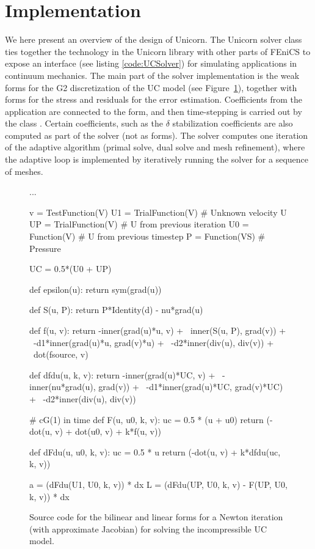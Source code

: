 \section{Implementation}

We here present an overview of the design of Unicorn. The Unicorn
solver class  ties together the technology in the
Unicorn library with other parts of FEniCS to expose an interface (see
listing \ref{code:UCSolver}) for simulating applications in continuum
mechanics. The main part of the solver implementation is the weak
forms for the G2 discretization of the UC model (see
Figure~\ref{code:FFC_UC}), together with forms for the stress and
residuals for the error estimation. Coefficients from the application
are connected to the form, and then time-stepping is carried out by
the class . Certain coefficients, such as the
$\delta$ stabilization coefficients are also computed as part of the
solver (not as forms). The solver computes one iteration of the
adaptive algorithm (primal solve, dual solve and mesh refinement),
where the adaptive loop is implemented by iteratively running the
solver for a sequence of meshes.

\begin{figure}
\bwfig
\begin{uflcode}
...

v = TestFunction(V)
U1 = TrialFunction(V) # Unknown velocity U
UP = TrialFunction(V) # U from previous iteration
U0 = Function(V)      # U from previous timestep
P = Function(VS)      # Pressure

UC = 0.5*(U0 + UP)

def epsilon(u):
    return sym(grad(u))

def S(u, P):
    return P*Identity(d) - nu*grad(u)

def f(u, v):
    return -inner(grad(u)*u, v) + \
        inner(S(u, P), grad(v)) + \
        -d1*inner(grad(u)*u, grad(v)*u) + \
        -d2*inner(div(u), div(v)) + \
        dot(fsource, v)

def dfdu(u, k, v):
    return -inner(grad(u)*UC, v) + \
        -inner(nu*grad(u), grad(v)) + \
        -d1*inner(grad(u)*UC, grad(v)*UC) + \
        -d2*inner(div(u), div(v))

# cG(1) in time
def F(u, u0, k, v):
    uc = 0.5 * (u + u0)
    return (-dot(u, v) + dot(u0, v) + k*f(u, v))

def dFdu(u, u0, k, v):
    uc = 0.5 * u
    return (-dot(u, v) + k*dfdu(uc, k, v))

a = (dFdu(U1, U0, k, v)) * dx
L = (dFdu(UP, U0, k, v) - F(UP, U0, k, v)) * dx
\end{uflcode}
\caption{Source code for the bilinear and linear forms for a Newton
  iteration (with approximate Jacobian) for solving the incompressible
  UC model.}
\label{code:FFC_UC}
\end{figure}

